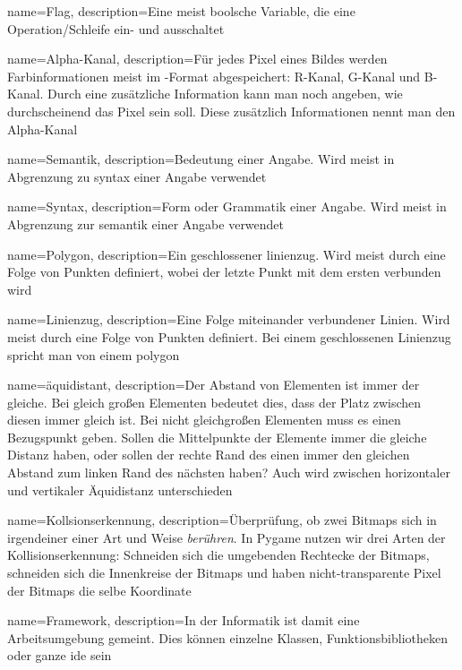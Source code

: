 {
  name={Flag},
  description={Eine meist boolsche Variable, die eine Operation/Schleife ein- und ausschaltet} 
}

{
  name={Alpha-Kanal},
  description={Für jedes Pixel eines Bildes werden Farbinformationen meist im -Format abgespeichert: R-Kanal, G-Kanal und B-Kanal. Durch eine zusätzliche Information kann man noch angeben, wie durchscheinend das Pixel sein soll. Diese zusätzlich Informationen nennt man den Alpha-Kanal} 
}

{
  name={Semantik},
  description={Bedeutung einer Angabe. Wird meist in Abgrenzung zu \Gls{syntax} einer Angabe verwendet} 
}

{
  name={Syntax},
  description={Form oder Grammatik einer Angabe. Wird meist in Abgrenzung zur \Gls{semantik} einer Angabe verwendet} 
}

{
  name={Polygon},
  description={Ein geschlossener \gls{linienzug}. Wird meist durch eine Folge von Punkten definiert, wobei der letzte Punkt mit dem ersten verbunden wird} 
}

{
  name={Linienzug},
  description={Eine Folge miteinander verbundener Linien. Wird meist durch eine Folge von Punkten definiert. Bei einem geschlossenen Linienzug spricht man von einem \gls{polygon}} 
}

{
	name={\"aquidistant},
	description={Der Abstand von Elementen ist immer der gleiche. Bei gleich großen Elementen bedeutet dies, dass der Platz zwischen diesen immer gleich ist. Bei nicht gleichgroßen Elementen muss es einen Bezugspunkt geben. Sollen die Mittelpunkte der Elemente immer die gleiche Distanz haben, oder sollen der rechte Rand des einen immer den gleichen Abstand zum linken Rand des nächsten haben? Auch wird zwischen horizontaler und vertikaler Äquidistanz unterschieden} 
}

 {
 	name={Kollsionserkennung},
 	description={Überprüfung, ob zwei Bitmaps sich in irgendeiner einer Art und Weise \emph{berühren}. In Pygame nutzen wir drei Arten der Kollisionserkennung: Schneiden sich die umgebenden Rechtecke der Bitmaps, schneiden sich die Innenkreise der Bitmaps und haben nicht-transparente Pixel der Bitmaps die selbe Koordinate} 
 }
 
 {
 	name={Framework},
 	description={In der Informatik ist damit eine Arbeitsumgebung gemeint. Dies können einzelne Klassen, Funktionsbibliotheken oder ganze \Gls{ide} sein} 
 }
 
